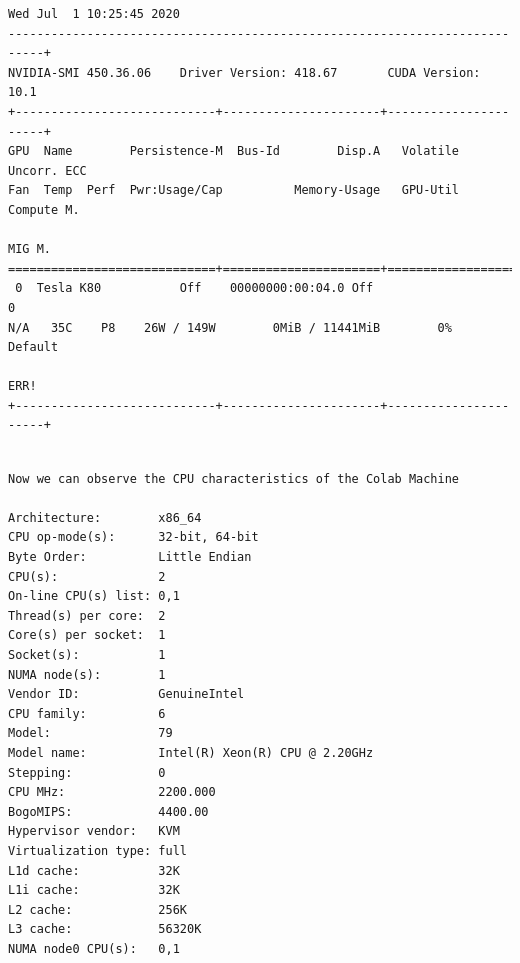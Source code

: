 \documentclass[oneside]{book}
\begin{document}

\begin{small}
\begin{verbatim}
Wed Jul  1 10:25:45 2020
---------------------------------------------------------------------------+
NVIDIA-SMI 450.36.06    Driver Version: 418.67       CUDA Version: 10.1
+----------------------------+----------------------+----------------------+
GPU  Name        Persistence-M  Bus-Id        Disp.A   Volatile Uncorr. ECC
Fan  Temp  Perf  Pwr:Usage/Cap          Memory-Usage   GPU-Util  Compute M.
                                                                     MIG M.
=============================+======================+======================
 0  Tesla K80           Off    00000000:00:04.0 Off                      0
N/A   35C    P8    26W / 149W        0MiB / 11441MiB        0%      Default
                                                                       ERR!
+----------------------------+----------------------+----------------------+
\end{verbatim}
\end{small}

\begin{small}
\begin{verbatim}

Now we can observe the CPU characteristics of the Colab Machine

Architecture:        x86_64
CPU op-mode(s):      32-bit, 64-bit
Byte Order:          Little Endian
CPU(s):              2
On-line CPU(s) list: 0,1
Thread(s) per core:  2
Core(s) per socket:  1
Socket(s):           1
NUMA node(s):        1
Vendor ID:           GenuineIntel
CPU family:          6
Model:               79
Model name:          Intel(R) Xeon(R) CPU @ 2.20GHz
Stepping:            0
CPU MHz:             2200.000
BogoMIPS:            4400.00
Hypervisor vendor:   KVM
Virtualization type: full
L1d cache:           32K
L1i cache:           32K
L2 cache:            256K
L3 cache:            56320K
NUMA node0 CPU(s):   0,1

\end{verbatim}
\end{small}
\end{document}
